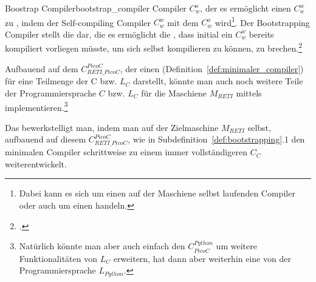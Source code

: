 \begin{Definition}{Boostrap Compiler}{bootstrap_compiler}
  Compiler $C_w^o$, der es ermöglicht einen  $C_w^w$ zu , indem der Self-compiling Compiler $C_w^w$ mit dem  $C_w^o$  wird\footnote{Dabei kann es sich um einen  auf der Maschiene selbst laufenden Compiler oder auch um einen  handeln.}. Der Bootstrapping Compiler stellt die   dar, die es ermöglicht die , dass initial ein  $C_w^w$ bereits kompiliert vorliegen müsste, um sich selbst kompilieren zu können, zu brechen.\footcite{thiemann_compilerbau_2021}
\end{Definition}

Aufbauend auf dem  $C_{RETI\_PicoC}^{PicoC}$, der einen  (Definition~\ref{def:minimaler_compiler}) für eine Teilmenge der  C bzw. $L_C$ darstellt, könnte man auch noch weitere Teile der Programmiersprache $C$ bzw. $L_C$ für die Maschiene $M_{RETI}$ mittels  implementieren.\footnote{Natürlich könnte man aber auch einfach den  $C_{PicoC}^{Python}$ um weitere Funktionalitäten von $L_C$ erweitern, hat dann aber weiterhin eine  von der Programmiersprache $L_{Python}$.}

Das bewerkstelligt man, indem man  auf der Zielmaschine $M_{RETI}$ selbst, aufbauend auf diesem  $C_{RETI\_PicoC}^{PicoC}$, wie in Subdefinition~\ref{def:bootstrapping}{.1} den minimalen Compiler schrittweise zu einem immer vollständigeren  $C_C$ weiterentwickelt.

